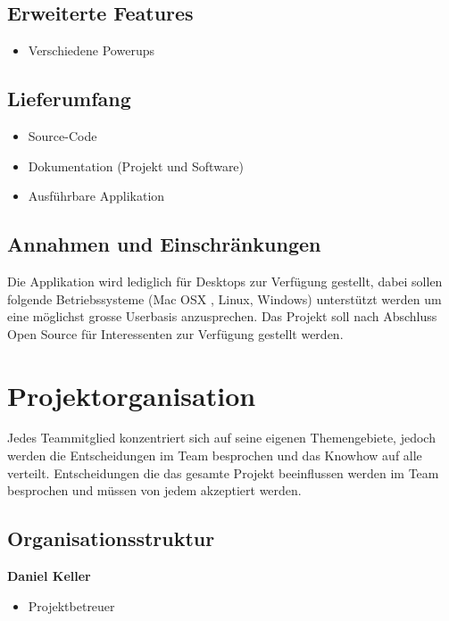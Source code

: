 \documentclass[11pt]{scrartcl}
\begin{document}
\subsection{Erweiterte Features}
\label{sec:Erweiterte Features}
\begin{itemize}
    \item Verschiedene Powerups
\end{itemize}

\subsection{Lieferumfang}
\label{sec:Lieferumfang}
\begin{itemize}
    \item Source-Code
    \item Dokumentation (Projekt und Software)
    \item Ausführbare Applikation
\end{itemize}

\subsection{Annahmen und Einschränkungen}
\label{sec:Annahmen und Einschränkungen}
Die Applikation wird lediglich für Desktops zur Verfügung gestellt, dabei sollen folgende Betriebssysteme (Mac OSX , Linux, Windows) unterstützt werden um eine möglichst grosse Userbasis anzusprechen.
Das Projekt soll nach Abschluss Open Source für Interessenten zur Verfügung gestellt werden.

\section{Projektorganisation}
\label{sec:Projektorganisation}
Jedes Teammitglied konzentriert sich auf seine eigenen Themengebiete, jedoch werden die Entscheidungen im Team besprochen und das Knowhow auf alle verteilt. Entscheidungen die das gesamte Projekt beeinflussen werden im Team besprochen und müssen von jedem akzeptiert werden.

\subsection{Organisationsstruktur}
\label{sec:Organisationsstruktur}
\textbf{Daniel Keller}
\begin{itemize}
    \item Projektbetreuer
\end{itemize}
\end{document}
